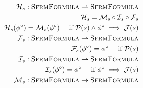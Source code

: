 \begin{align*}
\mathcal{H}_s : \textsc{SfrmFormula} \rightharpoonup \textsc{SfrmFormula}\\
\mathcal{H}_s = \mathcal{M}_s \circ \mathcal{I}_s \circ \mathcal{F}_s\\
\mathcal{H}_s({\phi}^{\circ}) = \mathcal{M}_s({\phi}^{\circ}) \quad\text{ if $\mathcal{P}(s) \wedge {\phi}^{\circ} \implies \mathcal{J}(s)$} \\
\mathcal{F}_s : \textsc{SfrmFormula} \rightharpoonup \textsc{SfrmFormula}\\
\mathcal{F}_s({\phi}^{\circ}) = {\phi}^{\circ} \quad\text{ if $\mathcal{P}(s)$} \\
\mathcal{I}_s : \textsc{SfrmFormula} \rightharpoonup \textsc{SfrmFormula}\\
\mathcal{I}_s({\phi}^{\circ}) = {\phi}^{\circ} \quad\text{ if ${\phi}^{\circ} \implies \mathcal{J}(s)$} \\
\mathcal{M}_s : \textsc{SfrmFormula} \rightarrow \textsc{SfrmFormula}\\
\end{align*}

